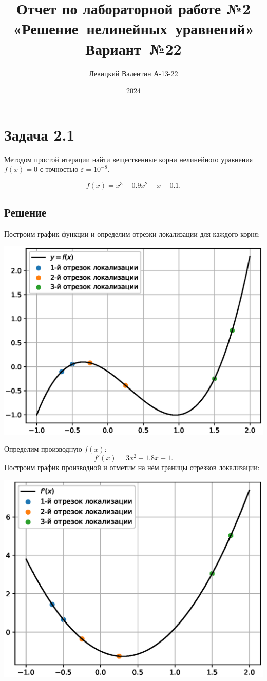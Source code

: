 \documentclass[a4paper,12pt,russian]{extreport}
\title{Отчет по лабораторной работе №2 «Решение~нелинейных~уравнений» Вариант~№22}
\author{Левицкий Валентин А-13-22}
\affil{НИУ «МЭИ»}
\date{2024}
\begin{document}
\maketitle

\section*{Задача 2.1}
Методом простой итерации найти вещественные корни нелинейного уравнения $f(x)=0$ с точностью $\varepsilon = 10^{-8}$.

\[ f(x) = x^3 - 0.9x^2 - x - 0.1. \]

\subsection*{Решение}
Построим график функции и определим отрезки локализации для каждого корня:

\includegraphics[width=\textwidth]{211.eps}

Определим производную $f(x)$:
\[ f'(x) = 3x^2 - 1.8 x - 1. \]
Построим график производной и отметим на нём границы отрезков локализации:

\includegraphics[width=\textwidth]{212.eps}
\end{document}
